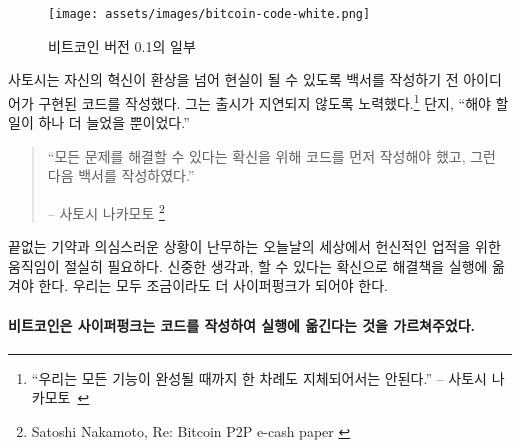 \begin{figure}
	\texttt{[image: assets/images/bitcoin-code-white.png]}
	\caption{비트코인 버전 0.1의 일부}
	\label{fig:bitcoin-code-white}
\end{figure}

\begin{comment}
	To make sure that his innovation transcends fantasy and becomes reality, Satoshi
	wrote code to implement his idea before he wrote the whitepaper. He also made
	sure not to delay\footnote{\enquote{We shouldn't delay forever until every possible
			feature is done.} -- Satoshi Nakamoto~\cite{satoshi-delay}} any release forever.
	After all, \enquote{there's always going to be one more thing to do.}
\end{comment}
사토시는 자신의 혁신이 환상을 넘어 현실이 될 수 있도록 백서를 작성하기 전 아이디어가 구현된 코드를 작성했다.
그는 출시가 지연되지 않도록 노력했다.\footnote{\enquote{우리는 모든 기능이 완성될 때까지 한 차례도 지체되어서는 안된다.} -- 사토시 나카모토~\cite{satoshi-delay}}
단지, \enquote{해야 할 일이 하나 더 늘었을 뿐이었다.}


\begin{quotation}\begin{samepage}
		\enquote{모든 문제를 해결할 수 있다는 확신을 위해 코드를 먼저 작성해야 했고, 그런 다음 백서를 작성하였다.}
		\begin{flushright} -- 사토시 나카모토 \footnote{Satoshi Nakamoto, Re: Bitcoin P2P e-cash paper \cite{satoshi-mail-code-first}}
\end{flushright}\end{samepage}\end{quotation}

\begin{comment}
	In today's world of endless promises and doubtful execution, an exercise
	in dedicated building was desperately needed. Be deliberate, convince
	yourself that you can actually solve the problems, and implement the
	solutions. We should all aim to be a bit more cypherpunk.
\end{comment}
끝없는 기약과 의심스러운 상황이 난무하는 오늘날의 세상에서 헌신적인 업적을 위한 움직임이 절실히 필요하다.
신중한 생각과, 할 수 있다는 확신으로 해결책을 실행에 옮겨야 한다.
우리는 모두 조금이라도 더 사이퍼펑크가 되어야 한다.

\paragraph{비트코인은 사이퍼펑크는 코드를 작성하여 실행에 옮긴다는 것을 가르쳐주었다.}

